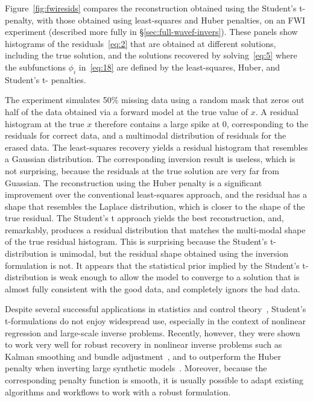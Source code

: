 \documentclass[nospthms]{svjour3}
\numberwithin{equation}{section}
\begin{document}
Figure~\ref{fig:fwiresids} compares the reconstruction obtained using
the Student's t-penalty, with those obtained using least-squares and
Huber penalties, on an FWI experiment (described more fully in
\S\ref{sec:full-wavef-invers}). These panels show histograms of the
residuals~\eqref{eq:2} that are obtained at different solutions,
including the true solution, and the solutions recovered by
solving~\eqref{eq:5} where the subfunctions $\phi_i$ in~\eqref{eq:18}
are defined by the least-squares, Huber, and Student's t- penalties.

The experiment simulates 50\% missing data using a random mask that
zeros out half of the data obtained via a forward model at the true
value of $x$.  A residual histogram at the true $x$ therefore contains
a large spike at $0$, corresponding to the residuals for correct data,
and a multimodal distribution of residuals for the erased data.  The
least-squares recovery yields a residual histogram that resembles a
Gaussian distribution. The corresponding inversion result is useless,
which is not surprising, because the residuals at the true solution are
very far from Guassian.  The reconstruction using the Huber penalty is a
significant improvement over the conventional least-squares approach,
and the residual has a shape that resembles the Laplace distribution,
which is closer to the shape of the true residual. The Student's t
approach yields the best reconstruction, and, remarkably, produces a
residual distribution that matches the multi-modal shape of the true
residual histogram.  This is surprising because the Student's
t-distribution is unimodal, but the residual shape obtained using the
inversion formulation is not. It appears that the statistical prior
implied by the Student's t-distribution is weak enough to allow the
model to converge to a solution that is almost fully consistent with
the good data, and completely ignors the bad data.

Despite several successful applications in statistics and control
theory~\cite{Lange1989,Fahr1998}, Student's t-formulations do not
enjoy widespread use, especially in the context of nonlinear
regression and large-scale inverse problems.  Recently, however, they
were shown to work very well for robust recovery in nonlinear inverse
problems such as Kalman smoothing and bundle
adjustment~\cite{AravkinThesis2010}, and to outperform the Huber
penalty when inverting large synthetic
models~\cite{AravkinLH:2011a,AravkinLH:2011b}. Moreover, because the
corresponding penalty function is smooth, it is usually possible to
adapt existing algorithms and workflows to work with a robust
formulation.
\end{document}
